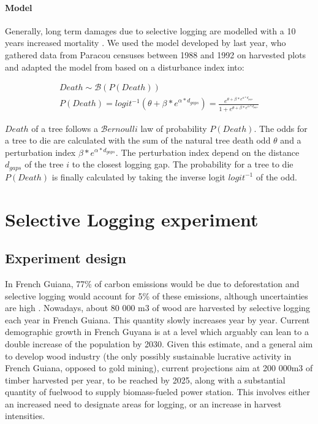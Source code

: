\documentclass[12pt,]{article}
\let\oldsection\section
\renewcommand\section{\newpage\oldsection}
\theoremstyle{definition}
\theoremstyle{definition}
\theoremstyle{definition}
\theoremstyle{remark}
\begin{document}
\paragraph{Model}\label{model-6}

Generally, long term damages due to selective logging are modelled with
a 10 years increased mortality \citep{Huth2004, Khler2004, Ruger2008}.
We used the model developed by \citet{Schmitt2017} last year, who
gathered data from Paracou censuses between 1988 and 1992 on harvested
plots and adapted the model from \citet{Herault2010} based on a
disturbance index into:

\begin{equation}
  \begin{array}{c} 
    Death \sim \mathcal{B}(P(Death)) \\
    P(Death) = logit^{-1}(\theta + \beta*e^{\alpha*d_{gaps}}) = \frac{e^{\theta + \beta*e^{\alpha*d_{gaps}}}}{1 + e^{\theta + \beta*e^{\alpha*d_{gaps}}}}
  \end{array}
  \label{eq:death}
\end{equation}

\(Death\) of a tree follows a \(\mathcal{B}ernoulli\) law of probability
\(P(Death)\). The odds for a tree to die are calculated with the sum of
the natural tree death odd \(\theta\) and a perturbation index
\(\beta*e^{\alpha*d_{gaps}}\). The perturbation index depend on the
distance \(d_{gaps}\) of the tree \(i\) to the closest logging gap. The
probability for a tree to die \(P(Death)\) is finally calculated by
taking the inverse logit \(logit^{-1}\) of the odd.

\section{Selective Logging
experiment}\label{selective-logging-experiment}

\subsection{Experiment design}\label{experiment-design}

In French Guiana, 77\% of carbon emissions would be due to deforestation
and selective logging would account for 5\% of these emissions, although
uncertainties are high \citep{Cabon2015}. Nowadays, about 80 000 m3 of
wood are harvested by selective logging each year in French Guiana. This
quantity slowly increases year by year. Current demographic growth in
French Guyana is at a level which arguably can lean to a double increase
of the population by 2030. Given this estimate, and a general aim to
develop wood industry (the only possibly sustainable lucrative activity
in French Guiana, opposed to gold mining), current projections aim at
200 000m3 of timber harvested per year, to be reached by 2025, along
with a substantial quantity of fuelwood to supply biomass-fueled power
station. This involves either an increased need to designate areas for
logging, or an increase in harvest intensities.
\end{document}
